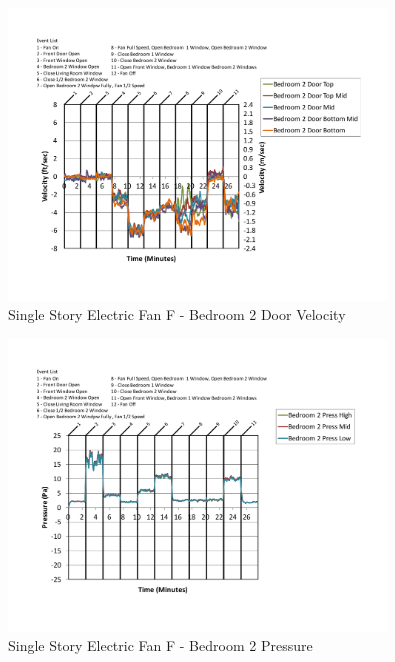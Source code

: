 \documentclass{article}
\begin{document}
\begin{appendices}
	\begin{figure}[H]
		\centering
		\includegraphics[height=3.05in,trim=0.67in 1.1in 0.67in 0.8in,clip=true]{0_Images/Results_Charts/ColdFlow/Single_Story/Electric/F/Bedroom_2_Door_Velocity.pdf}
		\caption{Single Story Electric Fan F - Bedroom 2 Door Velocity}
	\end{figure}
 

	\begin{figure}[H]
		\centering
		\includegraphics[height=3.05in,trim=0.67in 1.1in 0.67in 0.8in,clip=true]{0_Images/Results_Charts/ColdFlow/Single_Story/Electric/F/Bedroom_2_Pressure.pdf}
		\caption{Single Story Electric Fan F - Bedroom 2 Pressure}
	\end{figure}
 
	\clearpage


\end{appendices}
\end{document}
